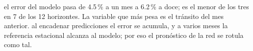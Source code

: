 {el error del modelo pasa de 4.5\,\% a un mes a 6.2\,\% a doce; es el menor de los tres en 7 de los 12 horizontes. La variable que más pesa es el tránsito del mes anterior.}
{al encadenar predicciones el error se acumula, y a varios meses la referencia estacional alcanza al modelo; por eso el pronóstico de la red se rotula como tal.}
